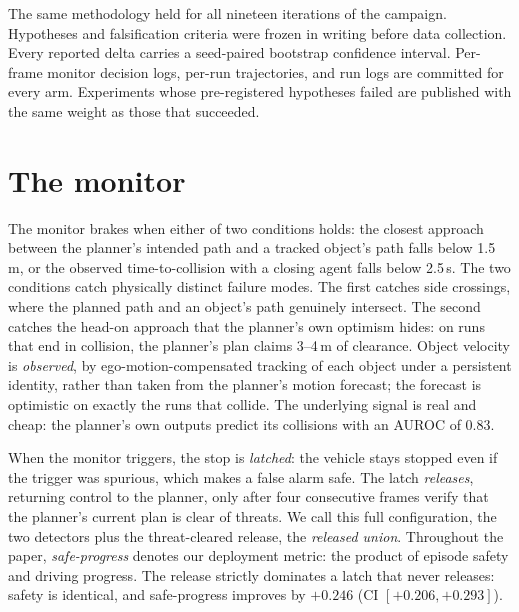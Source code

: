 \documentclass[11pt]{article}
\begin{document}
The same methodology held for all nineteen iterations of the campaign. Hypotheses and
falsification criteria were frozen in writing before data collection. Every reported delta
carries a seed-paired bootstrap confidence interval. Per-frame monitor decision logs, per-run
trajectories, and run logs are committed for every arm. Experiments whose pre-registered
hypotheses failed are published with the same weight as those that succeeded.

\section{The monitor}
The monitor brakes when either of two conditions holds: the closest approach between the
planner's intended path and a tracked object's path falls below 1.5\,m, or the observed
time-to-collision with a closing agent falls below 2.5\,s. The two conditions catch physically
distinct failure modes. The first catches side crossings, where the planned path and an
object's path genuinely intersect. The second catches the head-on approach that the planner's
own optimism hides: on runs that end in collision, the planner's plan claims 3--4\,m of
clearance. Object velocity is \emph{observed}, by ego-motion-compensated tracking of each
object under a persistent identity, rather than taken from the planner's motion forecast; the
forecast is optimistic on exactly the runs that collide. The underlying signal is real and
cheap: the planner's own outputs predict its collisions with an AUROC of 0.83.

When the monitor triggers, the stop is \emph{latched}: the vehicle stays stopped even if the
trigger was spurious, which makes a false alarm safe. The latch \emph{releases}, returning
control to the planner, only after four consecutive frames verify that the planner's current
plan is clear of threats. We call this full configuration, the two detectors plus the
threat-cleared release, the \emph{released union}. Throughout the paper, \emph{safe-progress}
denotes our deployment metric: the product of episode safety and driving progress. The release
strictly dominates a latch that never releases: safety is identical, and safe-progress
improves by $+0.246$ (CI $[+0.206, +0.293]$).
\end{document}

